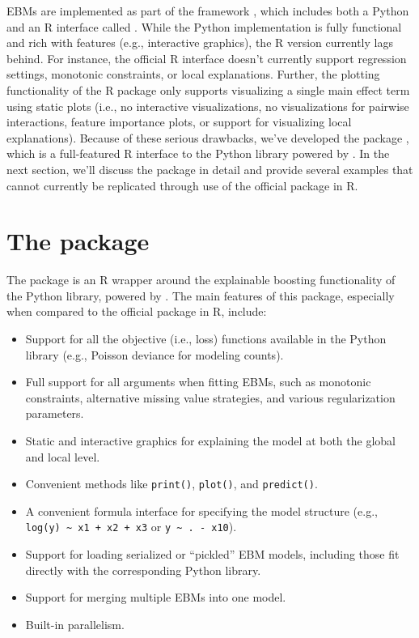 EBMs are implemented as part of the  framework
\citep{nori-2019-interpret}, which includes both a Python and an R
interface called . While the Python implementation is
fully functional and rich with features (e.g., interactive graphics),
the R version \citep{R-interpret} currently lags behind. For instance,
the official R interface doesn't currently support regression settings,
monotonic constraints, or local explanations. Further, the plotting
functionality of the  R package only supports
visualizing a single main effect term using static plots (i.e., no
interactive visualizations, no visualizations for pairwise interactions,
feature importance plots, or support for visualizing local
explanations). Because of these serious drawbacks, we've developed the
 package \citep{R-ebm}, which is a full-featured R
interface to the  Python library powered by
 \citep{R-reticulate}. In the next section, we'll
discuss the  package in detail and provide several examples
that cannot currently be replicated through use of the official
 package in R.

\section{\texorpdfstring{The 
package}{The  package}}\label{the-package}

The  package is an R wrapper around the explainable boosting
functionality of the  Python library, powered by
. The main features of this package, especially when
compared to the official  package in R, include:

\begin{itemize}
\tightlist
\item
  Support for all the objective (i.e., loss) functions available in the
  Python library (e.g., Poisson deviance for modeling counts).
\item
  Full support for all arguments when fitting EBMs, such as monotonic
  constraints, alternative missing value strategies, and various
  regularization parameters.
\item
  Static and interactive graphics for explaining the model at both the
  global and local level.
\item
  Convenient methods like \texttt{print()}, \texttt{plot()}, and
  \texttt{predict()}.
\item
  A convenient formula interface for specifying the model structure
  (e.g., \texttt{log(y)\ \textasciitilde{}\ x1\ +\ x2\ +\ x3} or
  \texttt{y\ \textasciitilde{}\ .\ -\ x10}).
\item
  Support for loading serialized or ``pickled'' EBM models, including
  those fit directly with the corresponding Python library.
\item
  Support for merging multiple EBMs into one model.
\item
  Built-in parallelism.
\end{itemize}

